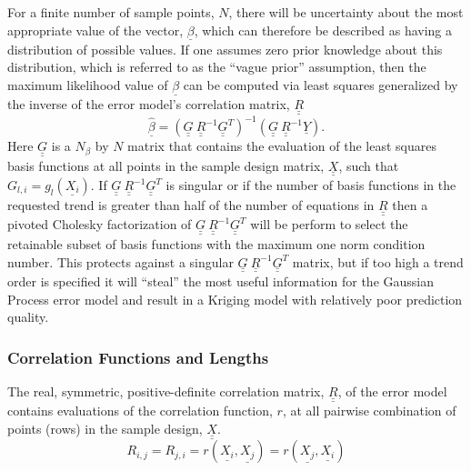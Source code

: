 \documentclass{article}
\begin{document}
For a finite number of sample points, $N$, there will be uncertainty
about the most appropriate value of the vector, $\underline{\beta}$,
which can therefore be described as having a distribution of possible
values.  If one assumes zero prior knowledge about this distribution,
which is referred to as the ``vague prior'' assumption, then the
maximum likelihood value of $\underline{\beta}$ can be computed via
least squares generalized by the inverse of the error model's
correlation matrix, $\underline{\underline{R}}$
\begin{displaymath}
\underline{\hat{\beta}}=\left(\underline{\underline{G}}\ \underline{\underline{R}}^{-1}\underline{\underline{G}}^T\right)^{-1}\left(\underline{\underline{G}}\ \underline{\underline{R}}^{-1}\underline{Y}\right).
\end{displaymath}
Here $\underline{\underline{G}}$ is a $N_\beta$ by $N$ matrix that 
contains the evaluation of the least 
squares basis functions at all points in the sample design matrix, 
$\underline{\underline{X}}$, 
such that $G_{l,i}=g_l\left(\underline{X_i}\right)$.  
If $\underline{\underline{G}}\ \underline{\underline{R}}^{-1}\underline{\underline{G}}^T$ 
is singular or if the number of basis functions in the requested trend is 
greater than half of the number of equations in $\underline{\underline{R}}$ 
then a pivoted Cholesky factorization of 
$\underline{\underline{G}}\ \underline{\underline{R}}^{-1}\underline{\underline{G}}^T$ 
will be perform to select the retainable subset of basis functions with the 
maximum one norm condition number.  This protects against a singular 
$\underline{\underline{G}}\ \underline{\underline{R}}^{-1}\underline{\underline{G}}^T$ 
matrix, but if too high a trend order is specified it will ``steal'' the most 
useful information for the Gaussian Process error model and result in a Kriging
model with relatively poor prediction quality.
\subsubsection{Correlation Functions and Lengths}
The real, symmetric, positive-definite correlation matrix, 
$\underline{\underline{R}}$, of the error model contains evaluations 
of the correlation function, $r$, at all pairwise combination of points 
(rows) in the sample design, $\underline{\underline{X}}$. 
\begin{displaymath}
R_{i,j}=R_{j,i}=r\left(\underline{X_i},\underline{X_j}\right)=r\left(\underline{X_j},\underline{X_i}\right)
\end{displaymath}
\end{document}
